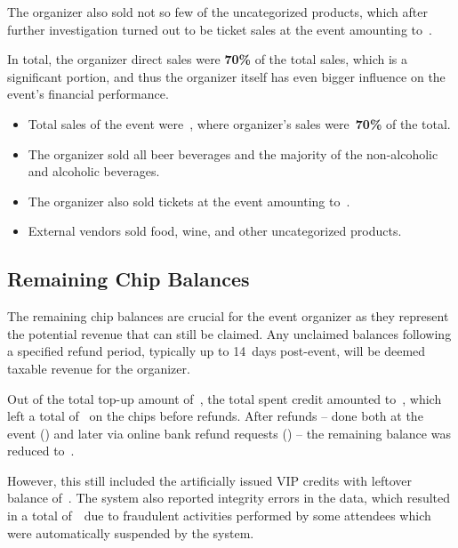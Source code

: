 The organizer also sold not so few of the uncategorized products, which after further investigation turned out to be ticket sales at the event amounting to~.

In total, the organizer direct sales were \textbf{70\%} of the total sales, which is a significant portion, and thus the organizer itself has even bigger influence on the event's financial performance.

\begin{keytakeaways}
	\begin{itemize}
		\item Total sales of the event were~, where organizer's sales were~\textbf{70\%} of the total.
		\item The organizer sold all beer beverages and the majority of the non-alcoholic and alcoholic beverages.
		\item The organizer also sold tickets at the event amounting to~.
		\item External vendors sold food, wine, and other uncategorized products.
	\end{itemize}
\end{keytakeaways}



\subsection{Remaining Chip Balances}
\label{subsec:analysis-remaining-balances}

The remaining chip balances are crucial for the event organizer as they represent the potential revenue that can still be claimed.
Any unclaimed balances following a specified refund period, typically up to 14~days post-event, will be deemed taxable revenue for the organizer.

Out of the total top-up amount of~, the total spent credit amounted to~, which left a total of~ on the chips before refunds.
After refunds – done both at the event () and later via online bank refund requests () – the remaining balance was reduced to~.

However, this still included the artificially issued VIP credits with leftover balance of~.
The system also reported integrity errors in the data, which resulted in a total of~~due to fraudulent activities performed by some attendees which were automatically suspended by the system.

